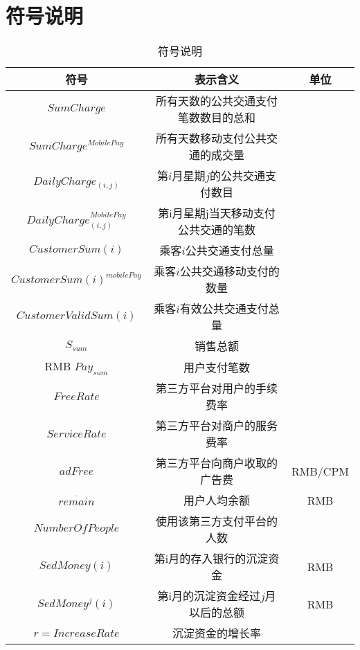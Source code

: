 \documentclass[withoutpreface,bwprint]{cumcmthesis} %
\begin{document}
\section{符号说明}
\begin{center}
\makeatletter{}\makeatother
\begin{table}[htbp]
\centering
\caption{符号说明}\label{tab:aStrangeTable}\centering%
\begin{tabular}{c|c|c}\hline
符号& 表示含义& 单位\\\hline
$SumCharge$ & 所有天数的公共交通支付笔数数目的总和 & \\
$SumCharge^{MobilePay}$ & 所有天数移动支付公共交通的成交量 & \\
$DailyCharge_{(i,j)}$&第$i$月星期$j$的公共交通支付数目&\\
$DailyCharge^{MobilePay}_{(i,j)}$&第i月星期j当天移动支付公共交通的笔数&\\
$CustomerSum(i)$&乘客$i$公共交通支付总量&\\
$CustomerSum(i)^{mobilePay}$&乘客$i$公共交通移动支付的数量&\\
$CustomerValidSum(i)$&乘客$i$有效公共交通支付总量&\\
$S_{sum}$&销售总额&\\RMB
$Pay_{sum}$&用户支付笔数&\\
$FreeRate$&第三方平台对用户的手续费率&\\
$ServiceRate$&第三方平台对商户的服务费率&\\
$adFree$&第三方平台向商户收取的广告费&RMB/CPM\\
$\overline {remain}$&用户人均余额&RMB\\
${NumberOfPeople}$&使用该第三方支付平台的人数&\\
$SedMoney(i)$&第i月的存入银行的沉淀资金&RMB\\
$SedMoney^j(i)$&第i月的沉淀资金经过$j$月以后的总额&RMB\\
$r=IncreaseRate$&沉淀资金的增长率&\\\hline
\end{tabular}
\end{table}
\end{center}
\end{document}
